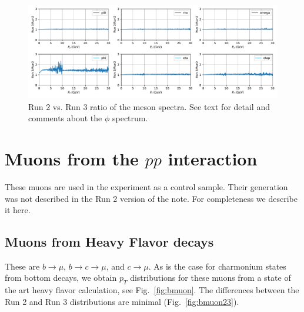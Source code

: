 \documentclass[12pt]{article}
\begin{document}
\begin{figure}[H]
  \begin{center}
    \includegraphics[width=\linewidth]{../mesonPt/mesons_run3_vs_run2.pdf}
    \caption{\protect Run 2 vs. Run 3 ratio of the meson
      spectra. See text for detail and comments about the $\phi$ spectrum.}
\label{fig:meson_run_comparison}
\end{center}
\end{figure}

\clearpage

\section{Muons from the $pp$ interaction}
These muons are used in the experiment as a control sample.
Their generation was not described in the Run 2 version of the note.  For completeness we describe it here.

\subsection{Muons from Heavy Flavor decays}
These are $b \to \mu$, $b \to c \to \mu$, and $c \to \mu$.  As is the case
for charmonium states from bottom decays, we obtain $p_T$ distributions for these muons from a state of the art heavy flavor calculation\cite{Cacciari:2012ny,Cacciari:2015fta}, see Fig.~\ref{fig:bmuon}.  The differences between the Run 2 and Run 3
distributions are minimal (Fig.~\ref{fig:bmuon23}).
\end{document}
